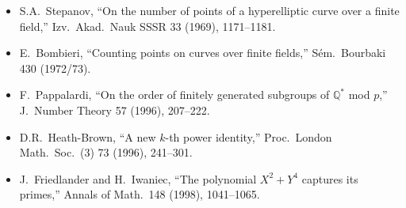 \documentclass[12pt]{amsart}
\theoremstyle{definition}
\theoremstyle{remark}
\begin{document}
\begin{itemize}
\item[{[Step69]}] S.A.\ Stepanov, ``On the number of points of a hyperelliptic curve over a finite field,'' Izv.\ Akad.\ Nauk SSSR 33 (1969), 1171--1181.
\item[{[B73]}] E.\ Bombieri, ``Counting points on curves over finite fields,'' S\'em.\ Bourbaki 430 (1972/73).
\item[{[P96]}] F.\ Pappalardi, ``On the order of finitely generated subgroups of $\mathbb{Q}^*$ mod $p$,'' J.\ Number Theory 57 (1996), 207--222.
\item[{[HB96]}] D.R.\ Heath-Brown, ``A new $k$-th power identity,'' Proc.\ London Math.\ Soc.\ (3) 73 (1996), 241--301.
\item[{[FI98]}] J.\ Friedlander and H.\ Iwaniec, ``The polynomial $X^2 + Y^4$ captures its primes,'' Annals of Math.\ 148 (1998), 1041--1065.
\end{itemize}
\end{document}
